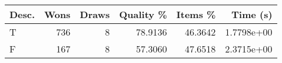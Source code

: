 \begin{tabular}{lrrrrr}
\hline
Desc. & Wons & Draws & Quality \% & Items \% & Time (s)   \\
\hline
T     & 736  & 8     & 78.9136    & 46.3642  & 1.7798e+00 \\
F     & 167  & 8     & 57.3060    & 47.6518  & 2.3715e+00 \\
\hline
\end{tabular}